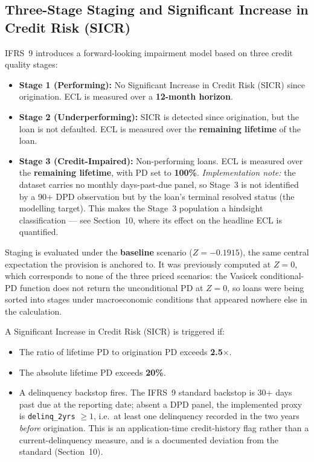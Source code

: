 \documentclass[11pt,a4paper]{article}
\begin{document}
\subsection{Three-Stage Staging and Significant Increase in Credit Risk (SICR)}
IFRS~9 \parencite{iasb2014} introduces a forward-looking impairment model based on three credit quality stages:
\begin{itemize}
    \item \textbf{Stage 1 (Performing):} No Significant Increase in Credit Risk (SICR) since origination. ECL is measured over a \textbf{12-month horizon}.
    \item \textbf{Stage 2 (Underperforming):} SICR is detected since origination, but the loan is not defaulted. ECL is measured over the \textbf{remaining lifetime} of the loan.
    \item \textbf{Stage 3 (Credit-Impaired):} Non-performing loans. ECL is measured over the \textbf{remaining lifetime}, with PD set to \textbf{100\%}. \emph{Implementation note:} the dataset carries no monthly days-past-due panel, so Stage~3 is not identified by a 90+ DPD observation but by the loan's terminal resolved status (the modelling target). This makes the Stage~3 population a hindsight classification --- see Section~10, where its effect on the headline ECL is quantified.
\end{itemize}

Staging is evaluated under the \textbf{baseline} scenario ($Z = -0.1915$), the same central expectation the provision is anchored to. It was previously computed at $Z = 0$, which corresponds to none of the three priced scenarios: the Vasicek conditional-PD function does not return the unconditional PD at $Z = 0$, so loans were being sorted into stages under macroeconomic conditions that appeared nowhere else in the calculation.

A Significant Increase in Credit Risk (SICR) \parencite{novotny2016} is triggered if:
\begin{itemize}
    \item The ratio of lifetime PD to origination PD exceeds \textbf{2.5$\times$}.
    \item The absolute lifetime PD exceeds \textbf{20\%}.
    \item A delinquency backstop fires. The IFRS~9 standard backstop is 30+ days past due at the reporting date; absent a DPD panel, the implemented proxy is \texttt{delinq\_2yrs} $\geq 1$, i.e.\ at least one delinquency recorded in the two years \emph{before} origination. This is an application-time credit-history flag rather than a current-delinquency measure, and is a documented deviation from the standard (Section~10).
\end{itemize}
\end{document}
